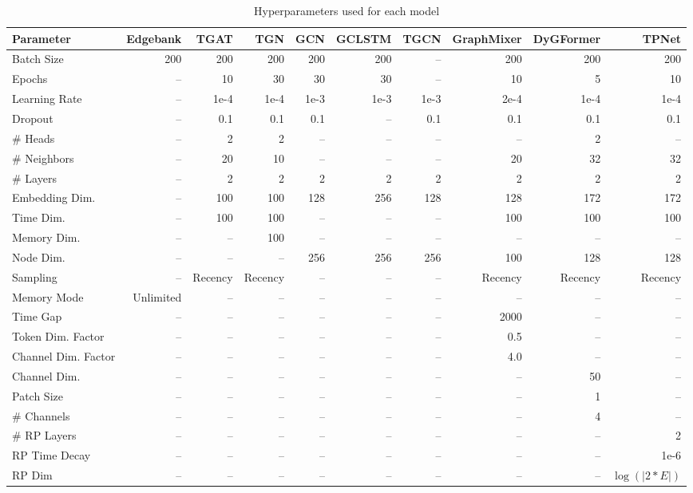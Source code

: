           
\begin{table}[h!]
\centering
\scriptsize
\setlength{\tabcolsep}{4pt}
\caption{Hyperparameters used for each model}
\begin{tabular}{lrrrrrrrrr}
\toprule
\textbf{Parameter} & \textbf{Edgebank} & \textbf{TGAT} & \textbf{TGN} & \textbf{GCN} & \textbf{GCLSTM} & \textbf{TGCN} & \textbf{GraphMixer} & \textbf{DyGFormer} & \textbf{TPNet} \\
\midrule
Batch Size             & 200 & 200 & 200 & 200 & 200 & – & 200 & 200 & 200 \\
Epochs                 & –   & 10  & 30  & 30  & 30  & – & 10  & 5   & 10 \\
Learning Rate          & –   & 1e-4& 1e-4& 1e-3& 1e-3& 1e-3 & 2e-4& 1e-4& 1e-4 \\
Dropout                & –   & 0.1 & 0.1 & 0.1 & –   & 0.1 & 0.1 & 0.1 & 0.1 \\
\# Heads               & –   & 2   & 2   & –   & –   & –   & –   & 2   & – \\
\# Neighbors           & –   & 20  & 10  & –   & –   & –   & 20  & 32  & 32 \\
\# Layers              & –   & 2   & 2   & 2   & 2   & 2   & 2   & 2   & 2 \\
Embedding Dim.         & –   & 100 & 100 & 128 & 256 & 128 & 128 & 172 & 172 \\
Time Dim.              & –   & 100 & 100 & –   & –   & –   & 100 & 100 & 100 \\
Memory Dim.            & –   & –   & 100 & –   & –   & –   & –   & –   & – \\
Node Dim.              & –   & –   & –   & 256 & 256 & 256 & 100 & 128 & 128 \\
Sampling               & –   & Recency & Recency & – & – & – & Recency & Recency & Recency \\
Memory Mode            & Unlimited & – & – & – & – & – & – & – & – \\
Time Gap               & –   & –   & –   & –   & –   & –   & 2000 & – & – \\
Token Dim. Factor      & –   & –   & –   & –   & –   & –   & 0.5 & – & – \\
Channel Dim. Factor    & –   & –   & –   & –   & –   & –   & 4.0 & – & – \\
Channel Dim.           & –   & –   & –   & –   & –   & –   & –   & 50  & – \\
Patch Size             & –   & –   & –   & –   & –   & –   & –   & 1   & – \\
\# Channels            & –   & –   & –   & –   & –   & –   & –   & 4   & – \\
\# RP Layers           & –   & –   & –   & –   & –   & –   & –   & –   & 2 \\
RP Time Decay          & –   & –   & –   & –   & –   & –   & –   & –   & 1e-6 \\
RP Dim                 & –   & –   & –   & –   & –   & –   & –   & –   & $\log(|2 * E|)$ \\
\bottomrule
\end{tabular}
\label{tab:hyperparams}
\end{table}

